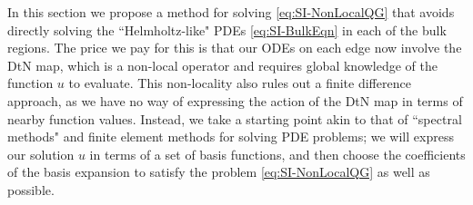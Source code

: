 In this section we propose a method for solving \eqref{eq:SI-NonLocalQG} that avoids directly solving the ``Helmholtz-like" PDEs \eqref{eq:SI-BulkEqn} in each of the bulk regions.
The price we pay for this is that our ODEs on each edge now involve the DtN map, which is a non-local operator and requires global knowledge of the function $u$ to evaluate.
This non-locality also rules out a finite difference approach, as we have no way of expressing the action of the DtN map in terms of nearby function values.
Instead, we take a starting point akin to that of ``spectral methods" and finite element methods for solving PDE problems; we will express our solution $u$ in terms of a set of basis functions, and then choose the coefficients of the basis expansion to satisfy the problem \eqref{eq:SI-NonLocalQG} as well as possible.


